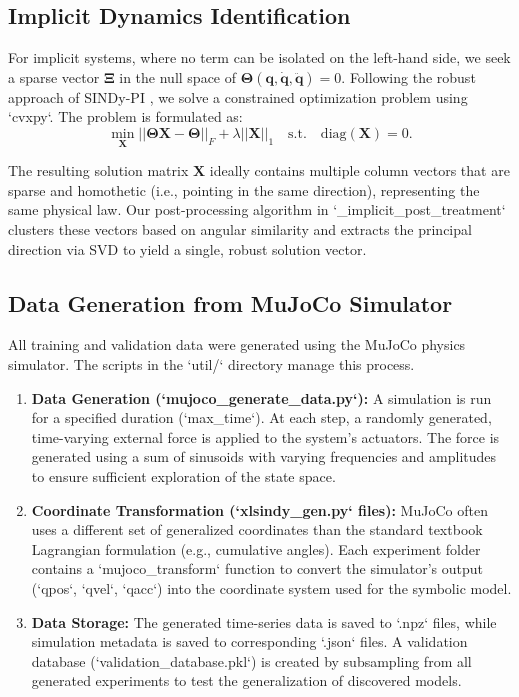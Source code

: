 \documentclass[12pt]{article}
\begin{document}
\subsection*{Implicit Dynamics Identification}
For implicit systems, where no term can be isolated on the left-hand side, we seek a sparse vector $\mathbf{\Xi}$ in the null space of $\mathbf{\Theta}(\mathbf{q}, \dot{\mathbf{q}}, \ddot{\mathbf{q}})=0$. Following the robust approach of SINDy-PI \cite{Kaheman2020_SINDyPI}, we solve a constrained optimization problem using `cvxpy`. The problem is formulated as:
\begin{equation}
	\min_{\mathbf{X}} ||\mathbf{\Theta X} - \mathbf{\Theta}||_F + \lambda||\mathbf{X}||_1 \quad \text{s.t.} \quad \text{diag}(\mathbf{X}) = 0.
\end{equation}

The resulting solution matrix $\mathbf{X}$ ideally contains multiple column vectors that are sparse and homothetic (i.e., pointing in the same direction), representing the same physical law. Our post-processing algorithm in `\_implicit\_post\_treatment` clusters these vectors based on angular similarity and extracts the principal direction via SVD to yield a single, robust solution vector.

\subsection*{Data Generation from MuJoCo Simulator}
All training and validation data were generated using the MuJoCo physics simulator. The scripts in the `util/` directory manage this process.
\begin{enumerate}
    \item \textbf{Data Generation (`mujoco\_generate\_data.py`):} A simulation is run for a specified duration (`max\_time`). At each step, a randomly generated, time-varying external force is applied to the system's actuators. The force is generated using a sum of sinusoids with varying frequencies and amplitudes to ensure sufficient exploration of the state space.
    \item \textbf{Coordinate Transformation (`xlsindy\_gen.py` files):} MuJoCo often uses a different set of generalized coordinates than the standard textbook Lagrangian formulation (e.g., cumulative angles). Each experiment folder contains a `mujoco\_transform` function to convert the simulator's output (`qpos`, `qvel`, `qacc`) into the coordinate system used for the symbolic model.
    \item \textbf{Data Storage:} The generated time-series data is saved to `.npz` files, while simulation metadata is saved to corresponding `.json` files. A validation database (`validation\_database.pkl`) is created by subsampling from all generated experiments to test the generalization of discovered models.
\end{enumerate}
\end{document}
